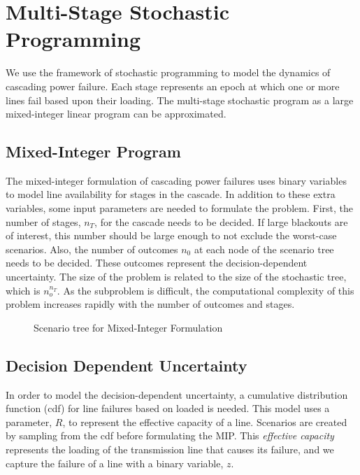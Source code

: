 \section{Multi-Stage Stochastic Programming}

We use the framework of stochastic programming to model the dynamics of cascading power failure.  Each stage represents an epoch at which one or more lines fail based upon their loading.  The multi-stage stochastic program as a large mixed-integer linear program can be approximated.

\subsection*{Mixed-Integer Program}
The mixed-integer formulation of cascading power failures uses binary variables to model line availability for stages in the cascade.  In addition to these extra variables, some input parameters are needed to formulate the problem.  First, the number of stages, $n_T$, for the cascade needs to be decided.  If large blackouts are of interest, this number should be large enough to not exclude the worst-case scenarios.  Also, the number of outcomes $n_0$ at each node  of the scenario tree needs to be decided.  These outcomes represent the decision-dependent uncertainty.  The size of the problem is related to the size of the stochastic tree, which is $n_o^{ n_T }$.  As the subproblem is difficult, the computational complexity of this problem increases rapidly with the number of outcomes and stages.

\begin{figure}
\centering

\caption{Scenario tree for Mixed-Integer Formulation}
  \label{fig:mip}
\end{figure}


\subsection{Decision Dependent Uncertainty}\label{decisiondependentuncertainty}
In order to model the decision-dependent uncertainty, a cumulative distribution function (cdf) for line failures based on loaded is needed.  This model uses a parameter, $R$, to represent the effective capacity of a line.  Scenarios are created by sampling from the cdf before formulating the MIP.  This { \it effective capacity} represents the loading of the transmission line that causes its failure, and we capture the failure of a line with a binary variable, $z$. \\

